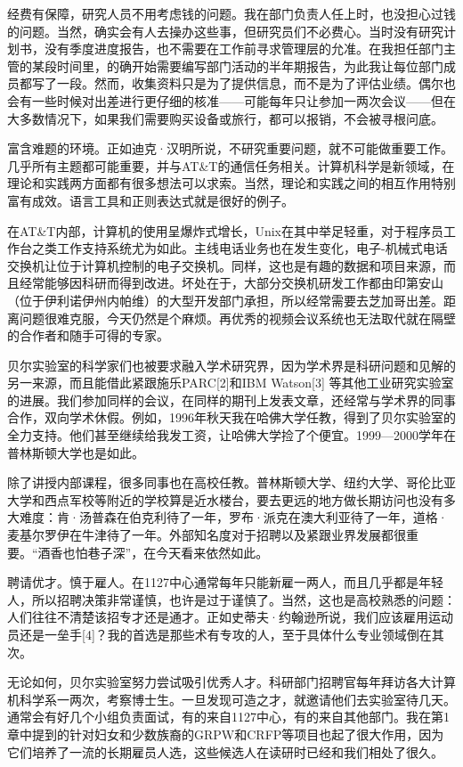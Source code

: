 \documentclass[a4paper,12pt,UTF8,twoside]{ctexbook}
\begin{document}
经费有保障，研究人员不用考虑钱的问题。我在部门负责人任上时，也没担心过钱的问题。当然，确实会有人去操办这些事，但研究员们不必费心。当时没有研究计划书，没有季度进度报告，也不需要在工作前寻求管理层的允准。在我担任部门主管的某段时间里，的确开始需要编写部门活动的半年期报告，为此我让每位部门成员都写了一段。然而，收集资料只是为了提供信息，而不是为了评估业绩。偶尔也会有一些时候对出差进行更仔细的核准——可能每年只让参加一两次会议——但在大多数情况下，如果我们需要购买设备或旅行，都可以报销，不会被寻根问底。

富含难题的环境。正如迪克·汉明所说，不研究重要问题，就不可能做重要工作。几乎所有主题都可能重要，并与AT\&T的通信任务相关。计算机科学是新领域，在理论和实践两方面都有很多想法可以求索。当然，理论和实践之间的相互作用特别富有成效。语言工具和正则表达式就是很好的例子。

在AT\&T内部，计算机的使用呈爆炸式增长，Unix在其中举足轻重，对于程序员工作台之类工作支持系统尤为如此。主线电话业务也在发生变化，电子-机械式电话交换机让位于计算机控制的电子交换机。同样，这也是有趣的数据和项目来源，而且经常能够因科研而得到改进。坏处在于，大部分交换机研发工作都由印第安山（位于伊利诺伊州内帕维）的大型开发部门承担，所以经常需要去芝加哥出差。距离问题很难克服，今天仍然是个麻烦。再优秀的视频会议系统也无法取代就在隔壁的合作者和随手可得的专家。

贝尔实验室的科学家们也被要求融入学术研究界，因为学术界是科研问题和见解的另一来源，而且能借此紧跟施乐PARC[2]和IBM Watson[3] 等其他工业研究实验室的进展。我们参加同样的会议，在同样的期刊上发表文章，还经常与学术界的同事合作，双向学术休假。例如，1996年秋天我在哈佛大学任教，得到了贝尔实验室的全力支持。他们甚至继续给我发工资，让哈佛大学捡了个便宜。1999—2000学年在普林斯顿大学也是如此。

除了讲授内部课程，很多同事也在高校任教。普林斯顿大学、纽约大学、哥伦比亚大学和西点军校等附近的学校算是近水楼台，要去更远的地方做长期访问也没有多大难度：肯·汤普森在伯克利待了一年，罗布·派克在澳大利亚待了一年，道格·麦基尔罗伊在牛津待了一年。外部知名度对于招聘以及紧跟业界发展都很重要。“酒香也怕巷子深”，在今天看来依然如此。

聘请优才。慎于雇人。在1127中心通常每年只能新雇一两人，而且几乎都是年轻人，所以招聘决策非常谨慎，也许是过于谨慎了。当然，这也是高校熟悉的问题：人们往往不清楚该招专才还是通才。正如史蒂夫·约翰逊所说，我们应该雇用运动员还是一垒手[4]？我的首选是那些术有专攻的人，至于具体什么专业领域倒在其次。

无论如何，贝尔实验室努力尝试吸引优秀人才。科研部门招聘官每年拜访各大计算机科学系一两次，考察博士生。一旦发现可造之才，就邀请他们去实验室待几天。通常会有好几个小组负责面试，有的来自1127中心，有的来自其他部门。我在第1章中提到的针对妇女和少数族裔的GRPW和CRFP等项目也起了很大作用，因为它们培养了一流的长期雇员人选，这些候选人在读研时已经和我们相处了很久。
\end{document}
